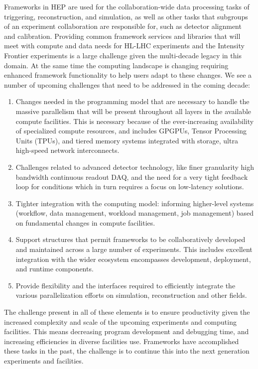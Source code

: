 \documentclass[12pt,a4paper]{article}
\begin{document}
Frameworks in HEP are used for the collaboration-wide data processing
tasks of triggering, reconstruction, and simulation, as well as other tasks that
subgroups of an experiment collaboration are responsible for, such as
detector alignment and calibration. 
Providing common framework services and libraries that will meet with
compute and data needs for HL-LHC experiments and the Intensity Frontier
experiments is a large challenge given the multi-decade legacy in this
domain. At the same time the computing landscape is changing requiring
enhanced framework functionality to help users adapt to these changes.
We see a number of upcoming challenges that need to be addressed in the
coming decade:

\begin{enumerate}
\item
    Changes needed in the programming model that are necessary to
    handle the massive parallelism that will be present throughout all
    layers in the available compute facilities. This is necessary
    because of the ever-increasing availability of specialized compute
    resources, and includes GPGPUs, Tensor Processing Units (TPUs),
    and tiered memory systems integrated with storage, ultra
    high-speed network interconnects.
\item
    Challenges related to advanced detector technology, like finer
    granularity high bandwidth continuous readout DAQ, and the need
    for a very tight feedback loop for conditions which in turn
    requires a focus on low-latency solutions.
\item
    Tighter integration with the computing model: informing
    higher-level systems (workflow, data management, workload
    management, job management) based on fundamental changes in
    compute facilities.
\item
    Support structures that permit frameworks to be collaboratively
    developed and maintained across a large number of
    experiments. This includes excellent integration with the wider
    ecosystem encompasses development, deployment, and runtime
    components.
\item
    Provide flexibility and the interfaces required to efficiently
    integrate the various parallelization efforts on simulation,
    reconstruction and other fields.
\end{enumerate}

The challenge present in all of these elements is to ensure
productivity given the increased complexity and scale of the upcoming
experiments and computing facilities. This means decreasing program
development and debugging time, and increasing efficiencies in diverse
facilities use.  Frameworks have accomplished these tasks in the past,
the challenge is to continue this into the next generation experiments
and facilities.
\end{document}
